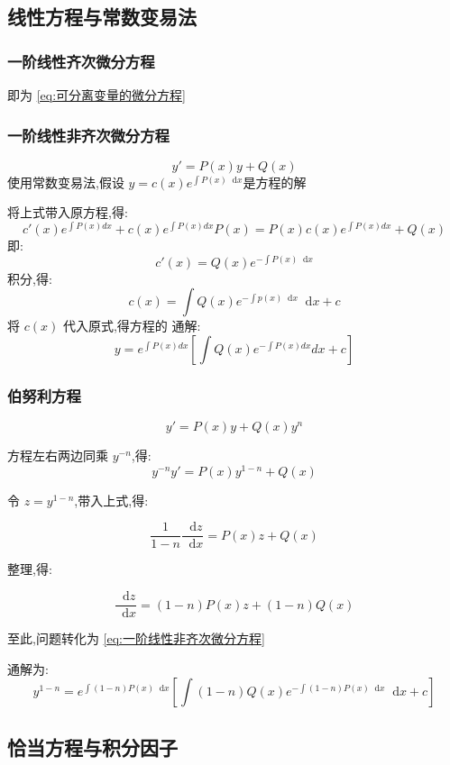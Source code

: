 \documentclass{ctexart}
\newcommand*{\dif}{\mathop{}\!\mathrm{d}}
\numberwithin{equation}{subsection}
\begin{document}
\subsection{线性方程与常数变易法}
\subsubsection{一阶线性齐次微分方程}
即为 \eqref{eq:可分离变量的微分方程}
\subsubsection{一阶线性非齐次微分方程}
\begin{equation} 
\label{eq:一阶线性非齐次微分方程}
y' = P(x)y + Q(x)
\end{equation}
使用常数变易法,假设 $y = c(x){e^{\int {P(x)\dif x} }}$是方程的解

将上式带入原方程,得:
        $$c'(x){e^{\int {P(x)dx} }} + c(x){e^{\int {P(x)dx} }}P(x) = P(x)c(x){e^{\int {P(x)dx} }} + Q(x)$$
        即:
        $$c'(x) = Q(x){e^{ - \int {P(x)\dif x} }}$$
        积分,得:
        $$c(x) = \int {Q(x){e^{ - \int {p(x)\dif x} }}\dif x + c} $$
        将 $c(x)$ 代入原式,得方程的
        \textcolor[rgb]{1,0,0}{通解:$$y = {e^{\int {P(x)dx} }}\left[\int {Q(x){e^{ - \int {P(x)dx} }}dx + c} \right]$$} 
        
\subsubsection{伯努利方程}
\begin{equation} 
        \label{eq:伯努利方程}
        y' = P(x)y + Q(x){y^n}
\end{equation}

方程左右两边同乘 $y^{- n}$,得:
\[{y^{ - n}}y' = P(x){y^{1 - n}} + Q(x)\]

令 $z = {y^{1 - n}}$,带入上式,得:

\[\frac{1}{{1 - n}}\frac{{\dif z}}{{\dif x}} = P(x)z + Q(x)\]

整理,得:

\[\frac{{\dif z}}{{\dif x}} = (1 - n)P(x)z + (1 - n)Q(x)\]

至此,问题转化为 \eqref{eq:一阶线性非齐次微分方程}

\textcolor[rgb]{1,0,0}{通解为:
\[
    {y^{1 - n}} = {e^{\int {(1 - n)P(x)\dif x} }}\left[\int {(1 - n)Q(x){e^{ - \int {(1 - n)P(x)\dif x} }}\dif x + c} \right]
\]} 

\subsection{恰当方程与积分因子}
\end{document}
